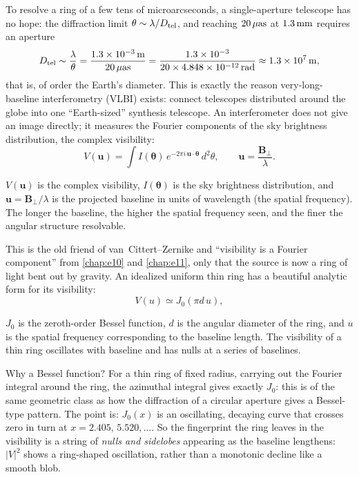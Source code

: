 To resolve a ring of a few tens of microarcseconds, a single-aperture telescope has no hope: the diffraction limit \(\theta\sim\lambda/D_{\rm tel}\), and reaching \(20\,\mu{\rm as}\) at \(1.3\,{\rm mm}\) requires an aperture
\[
  D_{\rm tel}\sim\frac{\lambda}{\theta}
  =\frac{1.3\times10^{-3}\,{\rm m}}{20\,\mu{\rm as}}
  =\frac{1.3\times10^{-3}}{20\times4.848\times10^{-12}\,{\rm rad}}
  \approx1.3\times10^{7}\,{\rm m},
\]
that is, of order the Earth's diameter. This is exactly the reason very-long-baseline interferometry (VLBI) exists: connect telescopes distributed around the globe into one ``Earth-sized'' synthesis telescope. An interferometer does not give an image directly; it measures the Fourier components of the sky brightness distribution, the complex visibility:
\begin{equation}
  V(\bm{u})=\int I(\bm{\theta})\,
  e^{-2\pi i\,\bm{u}\cdot\bm{\theta}}\,d^2\theta,
  \qquad
  \bm{u}=\frac{\bm{B}_\perp}{\lambda}.
  \label{eq:e19-vis}
\end{equation}
\begin{formulaexplain}
\(V(\bm u)\) is the complex visibility, \(I(\bm\theta)\) is the sky brightness distribution, and \(\bm u=\bm B_\perp/\lambda\) is the projected baseline in units of wavelength (the spatial frequency). The longer the baseline, the higher the spatial frequency seen, and the finer the angular structure resolvable.
\end{formulaexplain}
This is the old friend of van~Cittert--Zernike and ``visibility is a Fourier component'' from \ref{chap:e10} and \ref{chap:e11}, only that the source is now a ring of light bent out by gravity. An idealized uniform thin ring has a beautiful analytic form for its visibility:
\begin{equation}
  V(u)\simeq J_0(\pi d\,u),
  \label{eq:e19-bessel}
\end{equation}
\begin{formulaexplain}
\(J_0\) is the zeroth-order Bessel function, \(d\) is the angular diameter of the ring, and \(u\) is the spatial frequency corresponding to the baseline length. The visibility of a thin ring oscillates with baseline and has nulls at a series of baselines.
\end{formulaexplain}
Why a Bessel function? For a thin ring of fixed radius, carrying out the Fourier integral around the ring, the azimuthal integral gives exactly \(J_0\): this is of the same geometric class as how the diffraction of a circular aperture gives a Bessel-type pattern. The point is: \(J_0(x)\) is an oscillating, decaying curve that crosses zero in turn at \(x=2.405,\,5.520,\dots\). So the fingerprint the ring leaves in the visibility is a string of \emph{nulls and sidelobes} appearing as the baseline lengthens: \(|V|^2\) shows a ring-shaped oscillation, rather than a monotonic decline like a smooth blob.

